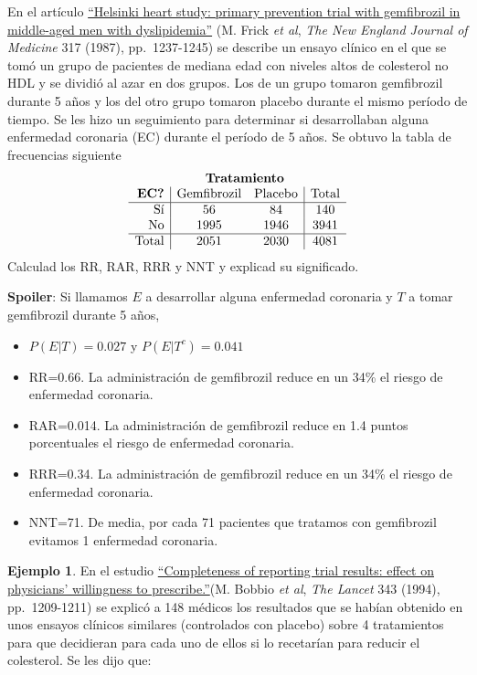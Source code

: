 \documentclass[
]{book}
\providecommand{\tightlist}{%
  \setlength{\itemsep}{0pt}\setlength{\parskip}{0pt}}
\theoremstyle{definition}
\theoremstyle{definition}
\newtheorem{example}{Ejemplo}[chapter]
\theoremstyle{definition}
\theoremstyle{definition}
\theoremstyle{remark}
\begin{document}
\begin{rmdexercici}
En el artículo \href{https://www.nejm.org/doi/full/10.1056/NEJM198711123172001}{``Helsinki heart study: primary prevention trial with gemfibrozil in middle-aged men with dyslipidemia''}
(M. Frick \emph{et al}, \emph{The New England Journal of Medicine} 317 (1987), pp.~1237-1245) se describe un ensayo clínico en el que se tomó un grupo de pacientes de mediana edad con niveles altos de colesterol no HDL y se dividió al azar en dos grupos. Los de un grupo tomaron gemfibrozil durante 5 años y los del otro grupo tomaron placebo durante el mismo período de tiempo. Se les hizo un seguimiento para determinar si desarrollaban alguna enfermedad coronaria (EC) durante el período de 5 años. Se obtuvo la tabla de frecuencias siguiente
\[
\begin{array}{l}
\hphantom{ECGemfibro} \textbf{Tratamiento}\\
\begin{array}{r|cc|c}
\textbf{EC?} & \text{Gemfibrozil} & \text{Placebo}& \text{Total} \\ \hline
\text{Sí} & 56 & 84 & 140\\
\text{No} & 1995 & 1946 & 3941 \\ \hline
\text{Total} & 2051 & 2030 & 4081
\end{array}
\end{array}
\]
Calculad los RR, RAR, RRR y NNT y explicad su significado.
\end{rmdexercici}

\textbf{Spoiler}: Si llamamos \(E\) a desarrollar alguna enfermedad coronaria y \(T\) a tomar gemfibrozil durante 5 años,

\begin{itemize}
\tightlist
\item
  \(P(E|T)=0.027\) y \(P(E|T^c)=0.041\)
\item
  RR=0.66. La administración de gemfibrozil reduce en un 34\% el riesgo de enfermedad coronaria.
\item
  RAR=0.014. La administración de gemfibrozil reduce en 1.4 puntos porcentuales el riesgo de enfermedad coronaria.
\item
  RRR=0.34. La administración de gemfibrozil reduce en un 34\% el riesgo de enfermedad coronaria.
\item
  NNT=71. De media, por cada 71 pacientes que tratamos con gemfibrozil evitamos 1 enfermedad coronaria.
\end{itemize}

\begin{example}
\protect\hypertarget{exm:unnamed-chunk-198}{}\label{exm:unnamed-chunk-198}En el estudio \href{https://www.sciencedirect.com/science/article/pii/S0140673694924074}{``Completeness of reporting trial results: effect on physicians' willingness to prescribe.''}(M. Bobbio \emph{et al}, \emph{The Lancet} 343 (1994), pp.~1209-1211) se explicó a 148 médicos los resultados que se habían obtenido en unos ensayos clínicos similares (controlados con placebo) sobre 4 tratamientos para que decidieran para cada uno de ellos si lo recetarían para reducir el colesterol. Se les dijo que:
\end{example}
\end{document}
